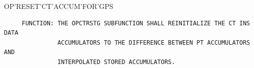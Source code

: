 \begin{frame}
OP'RESET'CT'ACCUM'FOR'GPS
\begin{verbatim}
     FUNCTION: THE OPCTRSTG SUBFUNCTION SHALL REINITIALIZE THE CT INS DATA 
               ACCUMULATORS TO THE DIFFERENCE BETWEEN PT ACCUMULATORS AND 
               INTERPOLATED STORED ACCUMULATORS. 

\end{verbatim}
\end{frame}
